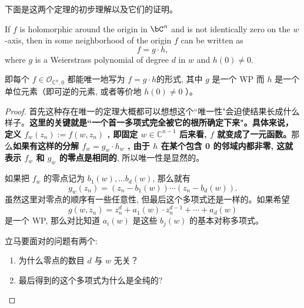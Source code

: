 \documentclass[lang=cn,12pt,fontset=none,a4paper]{beautybook}
\begin{document}
下面是这两个定理的初步理解以及它们的证明。
\begin{theorem}
   If $f$ is holomorphic around the origin in $\bC^n$ and is not identically zero on the $w$-axis, then in some neighborhood of the origin $f$ can be written as
   \[f=g\cdot h,\]
   where $g$ is a Weierstrass polynomial of degree $d$ in $w$ and $h(0)\neq 0$.
   
   即每个 $f \in \mathcal{O}_{\mathbb{C}^n, 0}$ 都能唯一地写为 $f=g \cdot h$的形式, 其中 $g$ 是一个 WP 而 $h$ 是一个单位元素（即可逆的元素, 或者等价地 $h(0) \neq 0$ ）。
\end{theorem}
\begin{proof}
   
   
   首先这种存在唯一的定理大概都可以想想这个``唯一性"会迫使结果长成什么样子。\textbf{这里的关键就是``一个首一多项式完全被它的根所确定下来"。具体来说，定义 $f_w\left(z_n\right):=f\left(w, z_n\right)$ , 即固定 $w \in \mathbb{C}^{n-1}$ 后来看, $f$ 就变成了一元函数。}那么\textbf{如果有这样的分解 $f_w=g_w \cdot h_w$ , 由于 $h$ 在某个包含 0 的邻域内都非零, 这就表示 $f_w$ 和 $g_w$ 的零点是相同的}, 所以唯一性是显然的。
   
   如果把 $f_w$ 的零点记为 $b_1(w), \ldots b_d(w)$, 那么就有 $$g_w\left(z_n\right)=\left(z_n-b_1(w)\right) \cdots\left(z_n-b_d(w)\right).$$ 虽然这里对零点的顺序有一些任意性, 但最后这个多项式还是一样的。如果希望 $$g\left(w, z_n\right)=z_n^d+a_1(w) \cdot z_n^{d-1}+\cdots+a_d(w)$$ 是一个 WP, 那么对比知道 $a_i(w)$ 是这些 $b_j(w)$ 的基本对称多项式。
   
   立马要面对的问题有两个:
   \begin{fancybox}
      \begin{enumerate}
         \item 为什么零点的数目 $d$ 与 $w$ 无关？
         \item 最后得到的这个多项式为什么是全纯的?
      \end{enumerate}
   \end{fancybox}
   

\end{proof}
\end{document}
